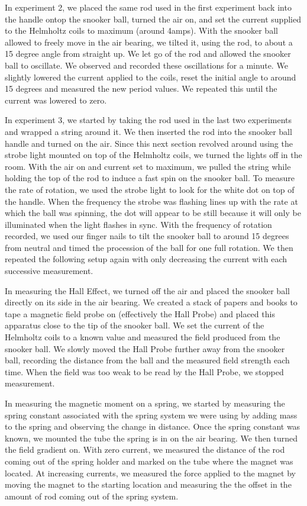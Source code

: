 \documentclass[aps,prl,10pt,twocolumn,floatfix]{revtex4-2}
\begin{document}
In experiment 2, we placed the same rod used in the first experiment back into the handle ontop the snooker ball, turned the air on, and set the current supplied to the Helmholtz coils to maximum (around 4amps). 
With the snooker ball allowed to freely move in the air bearing, we tilted it, using the rod, to about a 15 degree angle from straight up. 
We let go of the rod and allowed the snooker ball to oscillate.
We observed and recorded these oscillations for a minute. 
We slightly lowered the current applied to the coils, reset the initial angle to around 15 degrees and measured the new period values.
We repeated this until the current was lowered to zero. 

In experiment 3, we started by taking the rod used in the last two experiments and wrapped a string around it.
We then inserted the rod into the snooker ball handle and turned on the air. 
Since this next section revolved around using the strobe light mounted on top of the Helmholtz coils, we turned the lights off in the room. 
With the air on and current set to maximum, we pulled the string while holding the top of the rod to induce a fast spin on the snooker ball.
To measure the rate of rotation, we used the strobe light to look for the white dot on top of the handle. 
When the frequency the strobe was flashing lines up with the rate at which the ball was spinning, the dot will appear to be still because it will only be illuminated when the light flashes in sync. 
With the frequency of rotation recorded, we used our finger nails to tilt the snooker ball to around 15 degrees from neutral and timed the procession of the ball for one full rotation.
We then repeated the following setup again with only decreasing the current with each successive measurement. 

In measuring the Hall Effect, we turned off the air and placed the snooker ball directly on its side in the air bearing.
We created a stack of papers and books to tape a magnetic field probe on (effectively the Hall Probe) and placed this apparatus close to the tip of the snooker ball. 
We set the current of the Helmholtz coils to a known value and measured the field produced from the snooker ball.
We slowly moved the Hall Probe further away from the snooker ball, recording the distance from the ball and the measured field strength each time. 
When the field was too weak to be read by the Hall Probe, we stopped measurement.

In measuring the magnetic moment on a spring, we started by measuring the spring constant associated with the spring system we were using by adding mass to the spring and observing the change in distance. 
Once the spring constant was known, we mounted the tube the spring is in on the air bearing. 
We then turned the field gradient on. 
With zero current, we measured the distance of the rod coming out of the spring holder and marked on the tube where the magnet was located.
At increasing currents, we measured the force applied to the magnet by moving the magnet to the starting location and measuring the the offset in the amount of rod coming out of the spring system.
\end{document}
